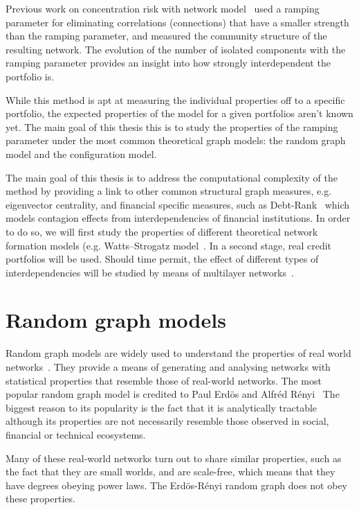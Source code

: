 \documentclass[12pt,beltcrest]{ociamthesis} %
\begin{document}
Previous work on concentration risk with network model~\citep{Sindel:2009vd} used a ramping parameter for eliminating correlations (connections) that have a smaller strength than the ramping parameter, and measured the community structure of the resulting network. The evolution of the number of isolated components with the ramping parameter provides an insight into how strongly interdependent the portfolio is.

While this method is apt at measuring the individual properties off to a specific portfolio, the expected properties of the model for a given portfolios aren't known yet.
The main goal of this thesis this is to study the properties of the ramping parameter under the most common theoretical graph models: the random graph model and the configuration model.

The main goal of this thesis is to address the computational complexity of the method by providing a link to other common structural graph measures, e.g. eigenvector centrality, and financial specific measures, such as Debt-Rank~\citep{Puliga:2012ev} which models contagion effects from interdependencies of financial institutions.
In order to do so, we will first study the properties of different theoretical network formation models (e.g. Watts–Strogatz model~\citep{Watts:1998db}.
In a second stage, real credit portfolios will be used. Should time permit, the effect of different types of interdependencies will be studied by means of multilayer networks~\citep{Kivela:2014dm}.


\section{Random graph models} %
\label{sec:random_graph_models}

Random graph models are widely used to understand the properties of real world networks~\cite{newman2002random}.
They provide a means of generating and analysing networks with statistical properties that resemble those of real-world networks.
The most popular random graph model is credited to Paul Erd\"os and Alfr\'ed R\'enyi~\cite{}
The biggest reason to its popularity is the fact that it is analytically tractable although its properties are not necessarily resemble those observed in social, financial or technical ecosystems.


Many of these real-world networks turn out to share similar properties, such as the fact that they are small worlds, and are scale-free, which means that they have degrees obeying power laws.
The Erd\"os-R\'enyi random graph does not obey these properties.
\end{document}
